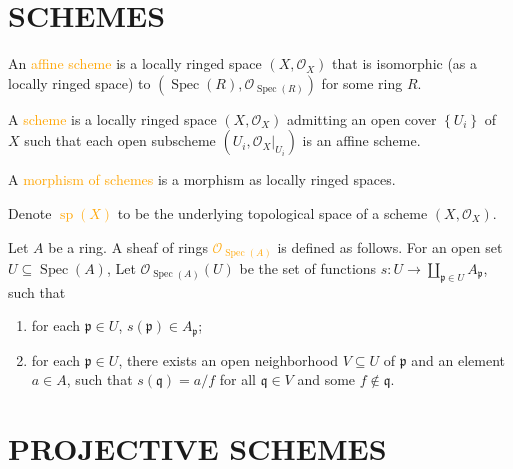 \section*{SCHEMES}

\begin{definition}
	An \textcolor{orange}{affine scheme} is a locally ringed space $\left(X,\mathcal{O}_X\right)$ that is isomorphic (as a locally ringed space) to $\left(\operatorname{Spec}(R),\mathcal{O}_{\operatorname{Spec}(R)}\right)$ for some ring $R$.
	
	A \textcolor{orange}{scheme} is a locally ringed space $\left(X,\mathcal{O}_X\right)$ admitting an open cover $\left\{U_i\right\}$ of $X$ such that each open subscheme $\left(U_i,\mathcal{O}_X|_{U_i}\right)$ is an affine scheme.
	
	A \textcolor{orange}{morphism of schemes} is a morphism as locally ringed spaces.

	Denote \textcolor{orange}{$\operatorname{sp}(X)$} to be the underlying topological space of a scheme $\left(X,\mathcal{O}_X\right)$.
\end{definition}

\begin{definition}
	Let $A$ be a ring. A sheaf of rings \textcolor{orange}{$\mathcal{O}_{\operatorname{Spec}(A)}$} is defined as follows. For an open set $U\subseteq\operatorname{Spec}(A)$, Let $\mathcal{O}_{\operatorname{Spec}(A)}(U)$ be the set of functions $s:U\rightarrow\coprod_{\mathfrak{p}\in U}A_\mathfrak{p}$, such that
	\begin{enumerate}[label=\textup{(\arabic*)}]
		\item for each $\mathfrak{p}\in U$, $s(\mathfrak{p})\in A_\mathfrak{p}$;
		\item for each $\mathfrak{p}\in U$, there exists an open neighborhood $V\subseteq U$ of $\mathfrak{p}$ and an element $a\in A$, such that $s(\mathfrak{q})=a/f$ for all $\mathfrak{q}\in V$ and some $f\notin\mathfrak{q}$.
	\end{enumerate}
\end{definition}

\section*{PROJECTIVE SCHEMES}

